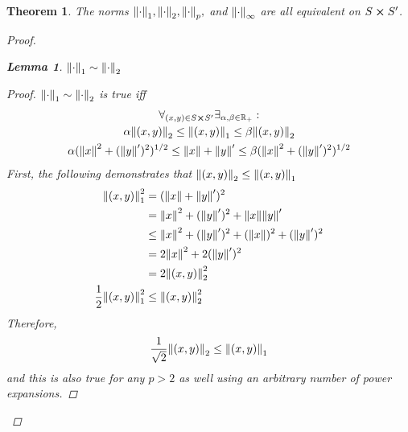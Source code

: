 \documentclass[]{article}
\newcommand{\R}{\mathbb{R}}
\newtheorem{theorem}{Theorem}
\newtheorem{lemma}{Lemma}
\begin{document}
\begin{theorem}
    The norms $\norm{\cdot}_1,\norm{\cdot}_2,\norm{\cdot}_p,$ and $\norm{\cdot}_\infty$ are all equivalent on $S \cross S'$.
    \begin{proof}
        \begin{lemma}\label{lem:2-1to2}
            $\norm{\cdot}_1 \sim \norm{\cdot}_2$
            \begin{proof}
                $\norm{\cdot}_1 \sim \norm{\cdot}_2$ is true iff
                \begin{multline*}
                    \forall_{(x,y) \in S \cross S'} \exists_{\alpha,\beta \in \R_+} :\\
                    \alpha \norm{(x,y)}_2 
                        \leq \norm{(x,y)}_1 
                        \leq \beta \norm{(x,y)}_2\\
                    \alpha (\norm{x}^2 + (\norm{y}')^2)^{1/2}
                        \leq \norm{x} + \norm{y}'
                        \leq \beta (\norm{x}^2 + (\norm{y}')^2)^{1/2}\\
                \end{multline*}
                First, the following demonstrates that $\norm{(x,y)}_2 \leq \norm{(x,y)}_1$
                \begin{align*}
                    \norm{(x,y)}_1^2
                        &= (\norm{x} + \norm{y}')^2\\
                        &= \norm{x}^2 + (\norm{y}')^2 + \norm{x}\norm{y}'\\
                        &\leq \norm{x}^2 + (\norm{y}')^2 + (\norm{x})^2 + (\norm{y}')^2\\
                        &= 2 \norm{x}^2 + 2(\norm{y}')^2\\
                        &= 2 \norm{(x,y)}_2^2\\
                    \frac{1}{2} \norm{(x,y)}_1^2 
                        &\leq \norm{(x,y)}_2^2
                \end{align*}
                Therefore,
                \[
                    \frac{1}{\sqrt{2}} \norm{(x,y)}_2 \leq \norm{(x,y)}_1
                \]
                and this is also true for any $p>2$ as well using an arbitrary number of power expansions.


\end{proof}
\end{lemma}
\end{proof}
\end{theorem}
\end{document}
